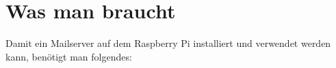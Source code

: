 \section{Was man braucht}
Damit ein Mailserver auf dem Raspberry Pi installiert und verwendet werden kann, benötigt man folgendes: 

